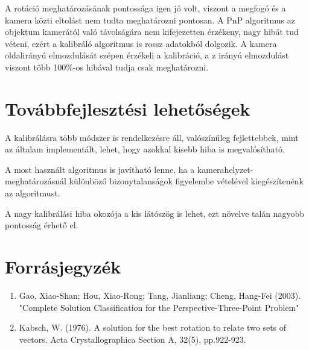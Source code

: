 \documentclass{article}
\begin{document}
	 A rotáció meghatározásának pontossága igen jó volt, viszont a megfogó és a kamera közti eltolást nem tudta meghatározni pontosan. A PnP algoritmus az objektum kamerától való távolságára nem kifejezetten érzékeny, nagy hibát tud véteni, ezért a kalibráló algoritmus is rossz adatokból dolgozik. A kamera oldalirányú elmozdulását szépen érzékeli a kalibráció, a z irányú elmozdulást viszont több 100\%-os hibával tudja csak meghatározni. 
	
	\section{Továbbfejlesztési lehetőségek}
	A kalibrálásra több módszer is rendelkezésre áll, valószínűleg fejlettebbek, mint az általam implementált, lehet, hogy azokkal kisebb hiba is megvalósítható.
	
	A most használt algoritmus is javítható lenne, ha a kamerahelyzet-meghatározásnál különböző bizonytalanságok figyelembe vételével kiegészítenénk az algoritmust.
	
	A nagy kalibrálási hiba okozója a kis látószög is lehet, ezt növelve talán nagyobb pontosság érhető el.
	
	\section{Forrásjegyzék}

\begin{enumerate}
\item Gao, Xiao-Shan; Hou, Xiao-Rong; Tang, Jianliang; Cheng, Hang-Fei (2003). "Complete Solution Classification for the Perspective-Three-Point Problem"

\item Kabsch, W. (1976). A solution for the best rotation to relate two sets of vectors. Acta Crystallographica Section A, 32(5), pp.922-923.
\end{enumerate}
\end{document}
